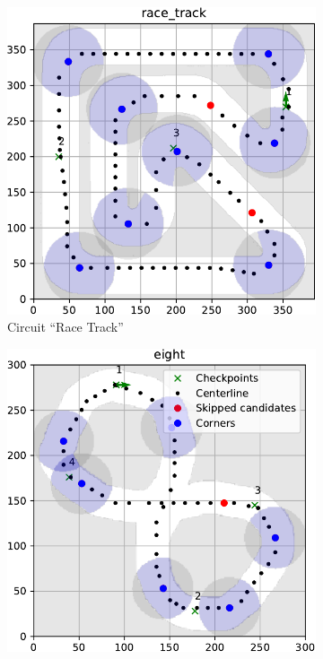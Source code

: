 \begin{figure}%
	\centering
	\begin{subfigure}[b]{0.49\textwidth}
		\centering
		\includegraphics[width=\textwidth]{../img/track-analysis/race_track}
		\caption{Circuit ``Race Track''}
	\end{subfigure}
	\hfill
	\begin{subfigure}[b]{0.49\textwidth}%
	\centering
	\includegraphics[width=\textwidth]{../img/track-analysis/eight}

\end{subfigure}
\end{figure}
